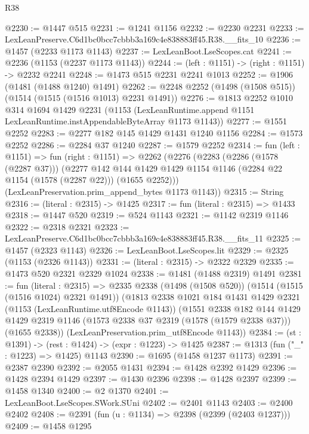 \begin{lexlean}{R38}
\begin{coremodule}
@2230 := @1447 @515
@2231 := @1241 @1156
@2232 := @2230 @2231
@2233 := LexLeanPreserve.C6d1bc0bcc7cbbb3a169c4e838883ff45.R38.__fits_10
@2236 := @1457 (@2233 @1173 @1143)
@2237 := LexLeanBoot.LseScopes.cat
@2241 := @2236 (@1153 (@2237 @1173 @1143))
@2244 := (left : @1151) -> (right : @1151) -> @2232 @2241
@2248 := @1473 @515 @2231 @2241 @1013
@2252 := @1906 (@1481 (@1488 @1240) @1491)
@2262 := @2248 @2252 (@1498 (@1508 @515)) (@1514 (@1515 (@1516 @1013) @2231 @1491))
@2276 := @1813
    @2252
    @1010
    @314
    @1694
    @1429
    @2231
    (@1153 (LexLeanRuntime.append @1151 LexLeanRuntime.instAppendableByteArray @1173 @1143))
@2277 := @1551 @2252
@2283 := @2277 @182 @145 @1429 @1431 @1240 @1156
@2284 := @1573 @2252
@2286 := @2284 @37 @1240
@2287 := @1579 @2252
@2314 := fun (left : @1151) =>
  fun (right : @1151) =>
  @2262
    (@2276
      (@2283
        (@2286 (@1578 (@2287 @37)))
        (@2277
          @142
          @144
          @1429
          @1429
          @1154
          @1146
          (@2284 @22 @1154 (@1578 (@2287 @22)))
          (@1655 @2252)))
      (LexLeanPreservation.prim_append_bytes @1173 @1143))
@2315 := String
@2316 := (literal : @2315) -> @1425
@2317 := fun (literal : @2315) => @1433
@2318 := @1447 @520
@2319 := @524 @1143
@2321 := @1142 @2319 @1146
@2322 := @2318 @2321
@2323 := LexLeanPreserve.C6d1bc0bcc7cbbb3a169c4e838883ff45.R38.__fits_11
@2325 := @1457 (@2323 @1143)
@2326 := LexLeanBoot.LseScopes.lit
@2329 := @2325 (@1153 (@2326 @1143))
@2331 := (literal : @2315) -> @2322 @2329
@2335 := @1473 @520 @2321 @2329 @1024
@2338 := @1481 (@1488 @2319) @1491
@2381 := fun (literal : @2315) =>
  @2335
    @2338
    (@1498 (@1508 @520))
    (@1514 (@1515 (@1516 @1024) @2321 @1491))
    (@1813
      @2338
      @1021
      @184
      @1431
      @1429
      @2321
      (@1153 (LexLeanRuntime.utf8Encode @1143))
      (@1551
        @2338
        @182
        @144
        @1429
        @1429
        @2319
        @1146
        (@1573 @2338 @37 @2319 (@1578 (@1579 @2338 @37)))
        (@1655 @2338))
      (LexLeanPreservation.prim_utf8Encode @1143))
@2384 := (st : @1391) -> (rest : @1424) -> (expr : @1223) -> @1425
@2387 := @1313 (fun ("_" : @1223) => @1425) @1143
@2390 := @1695 (@1458 @1237 @1173)
@2391 := @2387 @2390
@2392 := @2055 @1431
@2394 := @1428 @2392 @1429
@2396 := @1428 @2394 @1429
@2397 := @1430 @2396
@2398 := @1428 @2397
@2399 := @1458 @1340
@2400 := @2 @1370
@2401 := LexLeanBoot.LseScopes.SWork.SUni
@2402 := @2401 @1143
@2403 := @2400 @2402
@2408 := @2391 (fun (u : @1134) => @2398 (@2399 (@2403 @1237)))
@2409 := @1458 @1295

\end{coremodule}
\end{lexlean}
